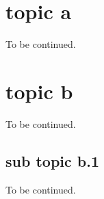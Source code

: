 \section{topic a}
\label{sec:related_work:jigsaw_puzzles}

To be continued.


\section{topic b}
\label{sec:related_work:relaxation_labeling}

To be continued.

\subsection{sub topic b.1}
\label{subsec:formulation_as_rl:rationale:type_2}

To be continued.

